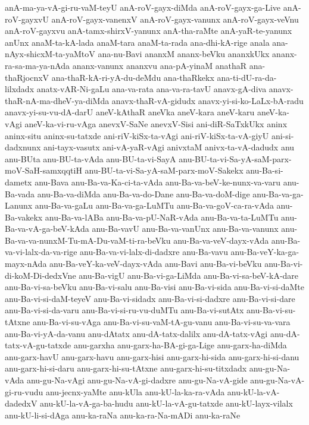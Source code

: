 {anA-ma-ya-vA-gi-ru-vaM-teyU
anA-roV-gayx-diMda
anA-roV-gayx-ga-Live
anA-roV-gayxvU
anA-roV-gayx-vanenxV
anA-roV-gayx-vanunx
anA-roV-gayx-veVnu
anA-roV-gayxvu
anA-tamx-shirxV-yanunx
anA-tha-raMte
anA-yaR-te-yanunx
anUnx
anaM-ta-kA-lada
anaM-tara
anaM-ta-rada
ana-dhi-kA-rige
anala
ana-nAyx-shicxM-ta-yaMtoV
ana-nu-Bavi
ananxM
ananx-beVku
ananxkUkx
ananx-ra-sa-ma-ya-nAda
ananx-vanunx
ananxvu
ana-pA-yinaM
anathaR
ana-thaRjocnxV
ana-thaR-kA-ri-yA-du-deMdu
ana-thaRkekx
ana-ti-dU-ra-da-lilxdadx
anatx-vAR-Ni-gaLu
ana-va-rata
ana-va-ra-tavU
anavx-gA-diva
anavx-thaR-nA-ma-dheV-ya-diMda
anavx-thaR-vA-gidudx
anavx-yi-si-ko-LaLx-bA-radu
anavx-yi-su-vu-dA-darU
aneV-kAthaR
aneVka
aneV-kara
aneV-karu
aneV-ka-vAgi
aneV-ka-vi-ru-vAga
anevxV-SaNe
anevxV-Sisi
ani-diR-SaTxkUkx
aninx
aninx-situ
aninx-su-tatxde
ani-riV-kiSx-ta-vAgi
ani-riV-kiSx-ta-vA-giyU
ani-si-dadxnunx
ani-tayx-vasutx
ani-vA-yaR-vAgi
anivxtaM
anivx-ta-vA-dadudx
anu
anu-BUta
anu-BU-ta-vAda
anu-BU-ta-vi-SayA
anu-BU-ta-vi-Sa-yA-saM-parx-moV-SaH-samxqqtiH
anu-BU-ta-vi-Sa-yA-saM-parx-moV-Sakekx
anu-Ba-si-dametx
anu-Bava
anu-Ba-va-Ka-ci-ta-vAda
anu-Ba-va-beV-ke-nunx-va-varu
anu-Ba-vada
anu-Ba-va-diMda
anu-Ba-va-do-Dane
anu-Ba-va-doM-dige
anu-Ba-va-ga-Lanunx
anu-Ba-va-gaLu
anu-Ba-va-ga-LuMTu
anu-Ba-va-goV-ca-ra-vAda
anu-Ba-vakekx
anu-Ba-va-lABa
anu-Ba-va-pU-NaR-vAda
anu-Ba-va-ta-LuMTu
anu-Ba-va-vA-ga-beV-kAda
anu-Ba-vavU
anu-Ba-va-vanUnx
anu-Ba-va-vanunx
anu-Ba-va-va-nunxM-Tu-mA-Du-vaM-ti-ra-beVku
anu-Ba-va-veV-dayx-vAda
anu-Ba-va-vi-lalx-da-va-rige
anu-Ba-va-vi-lalx-di-dadxre
anu-Ba-vavu
anu-Ba-veY-ka-ga-mayx-nAda
anu-Ba-veY-ka-veV-dayx-vAda
anu-Bavi
anu-Ba-vi-beVku
anu-Ba-vi-di-koM-Di-dedxVne
anu-Ba-vigU
anu-Ba-vi-ga-LiMda
anu-Ba-vi-sa-beV-kA-dare
anu-Ba-vi-sa-beVku
anu-Ba-vi-salu
anu-Ba-visi
anu-Ba-vi-sida
anu-Ba-vi-si-daMte
anu-Ba-vi-si-daM-teyeV
anu-Ba-vi-sidadx
anu-Ba-vi-si-dadxre
anu-Ba-vi-si-dare
anu-Ba-vi-si-da-varu
anu-Ba-vi-si-ru-vu-duMTu
anu-Ba-vi-sutAtx
anu-Ba-vi-su-tAtxne
anu-Ba-vi-su-vAga
anu-Ba-vi-su-vaM-tA-gu-vanu
anu-Ba-vi-su-va-vara
anu-Ba-vi-yA-da-vanu
anu-dAtatx
anu-dA-tatx-dalilx
anu-dA-tatx-vAgi
anu-dA-tatx-vA-gu-tatxde
anu-garxha
anu-garx-ha-BA-gi-ga-Lige
anu-garx-ha-diMda
anu-garx-havU
anu-garx-havu
anu-garx-hisi
anu-garx-hi-sida
anu-garx-hi-si-danu
anu-garx-hi-si-daru
anu-garx-hi-su-tAtxne
anu-garx-hi-su-titxdadx
anu-gu-Na-vAda
anu-gu-Na-vAgi
anu-gu-Na-vA-gi-dadxre
anu-gu-Na-vA-gide
anu-gu-Na-vA-gi-ru-vudu
anu-jecnx-yaMte
anu-kUla
anu-kU-la-ka-ra-vAda
anu-kU-la-vA-dadedxV
anu-kU-la-vA-ga-ba-hudu
anu-kU-la-vA-gu-tatxde
anu-kU-layx-vilalx
anu-kU-li-si-dAga
anu-ka-raNa
anu-ka-ra-Na-mADi
anu-ka-raNe
}
